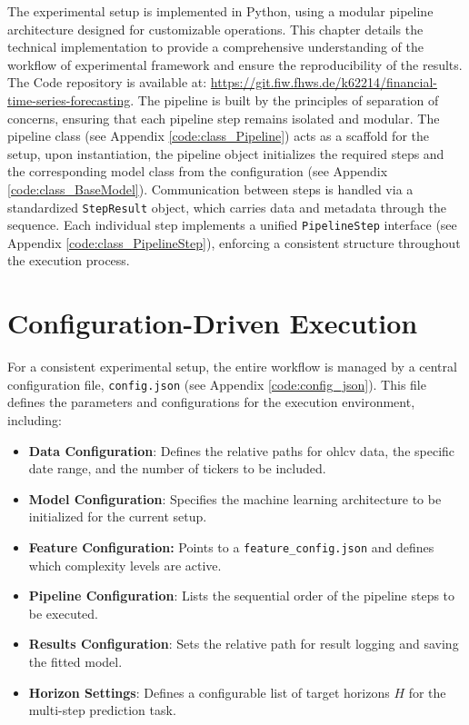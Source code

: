 \documentclass[12pt,twoside=false,a4paper,parskip]{scrbook}
\begin{document}
The experimental setup is implemented in Python, using a modular pipeline architecture designed for customizable operations. This chapter details the technical implementation to provide a comprehensive understanding of the workflow of experimental framework and ensure the reproducibility of the results. The Code repository is available at: \url{https://git.fiw.fhws.de/k62214/financial-time-series-forecasting}.
The pipeline is built by the principles of separation of concerns, ensuring that each pipeline step remains isolated and modular. The pipeline class (see Appendix \ref{code:class_Pipeline}) acts as a scaffold for the setup, upon instantiation, the pipeline object initializes the required steps and the corresponding model class from the configuration (see Appendix \ref{code:class_BaseModel}). Communication between steps is handled via a standardized \texttt{StepResult} object, which carries data and metadata through the sequence. Each individual step implements a unified \texttt{PipelineStep} interface (see Appendix \ref{code:class_PipelineStep}), enforcing a consistent structure throughout the execution process.
 


\section{Configuration-Driven Execution}

For a consistent experimental setup, the entire workflow is managed by a central configuration file, \texttt{config.json} (see Appendix \ref{code:config_json}). This file defines the parameters and configurations for the execution environment, including:


\begin{itemize}
    \item \textbf{Data Configuration}: Defines the relative paths for \gls{ohlcv} data, the specific date range, and the number of tickers to be included.
    \item \textbf{Model Configuration}: Specifies the machine learning architecture to be initialized for the current setup.
    \item \textbf{Feature Configuration:} Points to a \texttt{feature\_config.json} and defines which complexity levels are active.
    \item \textbf{Pipeline Configuration}: Lists the sequential order of the pipeline steps to be executed.
    \item \textbf{Results Configuration}: Sets the relative path for result logging and saving the fitted model.
    \item \textbf{Horizon Settings}: Defines a configurable list of target horizons $H$ for the multi-step prediction task.
\end{itemize}
\end{document}
